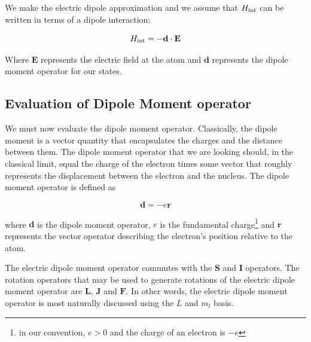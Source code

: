 We make the electric dipole approximation and we assume that $H_\textnormal{int}$ can be written in terms of a dipole interaction:  \cite{demilleBudkerKimball}\cite{cuaMITnotes}\cite{gustavsonThesis}\cite{Young1997363}

\begin{equation}
H_\textnormal{int}=-\mathbf{d}\cdot\mathbf{E}
\end{equation}

Where $\mathbf{E}$ represents the electric field at the atom %
and $\mathbf{d}$ represents the dipole moment operator for our states. 


\subsection{Evaluation of Dipole Moment operator}
We must now evaluate the dipole moment operator. 
Classically, the dipole moment is a vector quantity that encapsulates the charges and the distance between them. The dipole moment operator that we are looking should, in the classical limit, equal the charge of the electron times some vector that roughly represents the displacement between the electron and the nucleus. The dipole moment operator is defined as 

\begin{equation}
\mathbf{d}=-e\mathbf{r}
\end{equation}

where $\mathbf{d}$ is the dipole moment operator, $e$ is the fundamental charge\footnote{in our convention, $e>0$ and the charge of an electron is $-e$} and $\mathbf{r}$ represents the vector operator describing the electron's position relative to the atom\cite{demilleBudkerKimball}.

The electric dipole moment operator commutes with the $\mathbf{S}$ and $\mathbf{I}$ operators. The rotation operators that may be used to generate rotations of the electric dipole moment operator are $\mathbf{L}$, $\mathbf{J}$ and $\mathbf{F}$\cite{DeMille_presentation}. In other words, the electric dipole moment operator is most naturally discussed using the $L$ and $m_l$ basis. 

